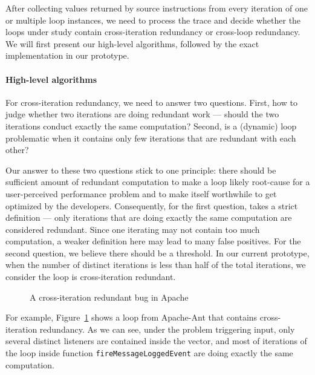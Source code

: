 After collecting values returned by source instructions from every iteration
of one or multiple loop instances, we need to process the trace and decide
whether the loops under study contain cross-iteration redundancy or 
cross-loop redundancy. We will first present our high-level algorithms, followed
by the exact implementation in our prototype.

\paragraph{High-level algorithms}
For cross-iteration redundancy, we need to answer two questions. 
First, how to judge whether
two iterations are doing redundant work --- should the two iterations conduct
exactly the same computation?
Second, is a (dynamic) loop problematic when it contains only few 
iterations that are
redundant with each other?

Our answer to these two questions stick to one principle: there should be
sufficient amount of redundant computation to make a loop likely root-cause
for a user-perceived performance problem and to make itself worthwhile to
get optimized by the developers. Consequently,
for the first question, \Tool takes a strict 
definition --- only iterations that are doing exactly the same computation are
considered redundant. Since one iterating may not contain too much computation,
a weaker definition here may lead to many false positives. For the 
second question, we believe there should be a threshold. In our current 
prototype,
when the number of distinct iterations is less than half of the total iterations, 
we consider the loop is cross-iteration redundant. 

\begin{figure}
  \centering
  \mbox{}
  \caption{A cross-iteration redundant bug in Apache}
  \label{fig:Apache37184}
\end{figure}

For example, Figure~\ref{fig:Apache37184} shows a loop from Apache-Ant that
contains cross-iteration redundancy.
As we can see, under the problem triggering input, 
only several distinct listeners are contained inside the vector, and most of 
iterations of the loop inside function \texttt{fireMessageLoggedEvent}
are doing exactly the same computation. 





